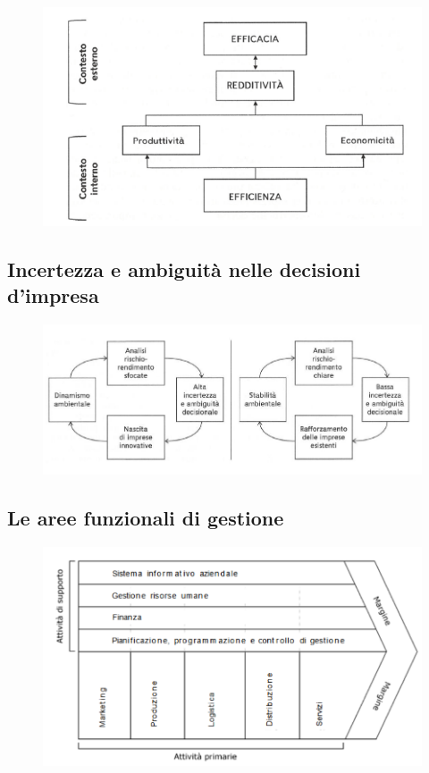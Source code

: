 \begin{figure}[H]
    \centering
    \includegraphics[width=0.5\linewidth]{1/img/Screenshot from 2022-07-03 11-35-16.png}
\end{figure}

\subsection{Incertezza e ambiguità nelle decisioni d'impresa}

\begin{figure}[H]
    \centering
    \includegraphics[width=0.7\linewidth]{1/img/Screenshot from 2022-07-03 11-36-56.png}
\end{figure}

\subsection{Le aree funzionali di gestione}

\begin{figure}[H]
    \centering
    \includegraphics[width=0.7\linewidth]{1/img/Screenshot from 2022-07-03 16-14-51.png}
\end{figure}

